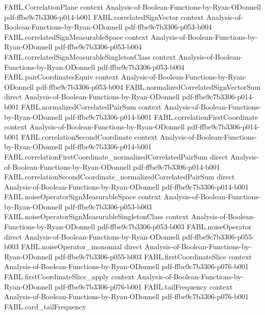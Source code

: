 \begin{theorem}
\proofstep
  {FABL.CorrelationPlane}
  {context}
  {Analysis-of-Boolean-Functions-by-Ryan-ODonnell}
  {pdf-ffbe9c7b3306-p014-b001}
\proofstep
  {FABL.correlatedSignVector}
  {context}
  {Analysis-of-Boolean-Functions-by-Ryan-ODonnell}
  {pdf-ffbe9c7b3306-p053-b004}
\proofstep
  {FABL.correlatedSignMeasurableSpace}
  {context}
  {Analysis-of-Boolean-Functions-by-Ryan-ODonnell}
  {pdf-ffbe9c7b3306-p053-b004}
\proofstep
  {FABL.correlatedSignMeasurableSingletonClass}
  {context}
  {Analysis-of-Boolean-Functions-by-Ryan-ODonnell}
  {pdf-ffbe9c7b3306-p053-b004}
\proofstep
  {FABL.pairCoordinatesEquiv}
  {context}
  {Analysis-of-Boolean-Functions-by-Ryan-ODonnell}
  {pdf-ffbe9c7b3306-p053-b004}
\proofstep
  {FABL.normalizedCorrelatedSignVectorSum}
  {direct}
  {Analysis-of-Boolean-Functions-by-Ryan-ODonnell}
  {pdf-ffbe9c7b3306-p014-b001}
\proofstep
  {FABL.normalizedCorrelatedPairSum}
  {context}
  {Analysis-of-Boolean-Functions-by-Ryan-ODonnell}
  {pdf-ffbe9c7b3306-p014-b001}
\proofstep
  {FABL.correlationFirstCoordinate}
  {context}
  {Analysis-of-Boolean-Functions-by-Ryan-ODonnell}
  {pdf-ffbe9c7b3306-p014-b001}
\proofstep
  {FABL.correlationSecondCoordinate}
  {context}
  {Analysis-of-Boolean-Functions-by-Ryan-ODonnell}
  {pdf-ffbe9c7b3306-p014-b001}
\proofstep
  {FABL.correlationFirstCoordinate_normalizedCorrelatedPairSum}
  {direct}
  {Analysis-of-Boolean-Functions-by-Ryan-ODonnell}
  {pdf-ffbe9c7b3306-p014-b001}
\proofstep
  {FABL.correlationSecondCoordinate_normalizedCorrelatedPairSum}
  {direct}
  {Analysis-of-Boolean-Functions-by-Ryan-ODonnell}
  {pdf-ffbe9c7b3306-p014-b001}
\proofstep
  {FABL.noiseOperatorSignMeasurableSpace}
  {context}
  {Analysis-of-Boolean-Functions-by-Ryan-ODonnell}
  {pdf-ffbe9c7b3306-p053-b003}
\proofstep
  {FABL.noiseOperatorSignMeasurableSingletonClass}
  {context}
  {Analysis-of-Boolean-Functions-by-Ryan-ODonnell}
  {pdf-ffbe9c7b3306-p053-b003}
\proofstep
  {FABL.noiseOperator}
  {direct}
  {Analysis-of-Boolean-Functions-by-Ryan-ODonnell}
  {pdf-ffbe9c7b3306-p055-b003}
\proofstep
  {FABL.noiseOperator_monomial}
  {direct}
  {Analysis-of-Boolean-Functions-by-Ryan-ODonnell}
  {pdf-ffbe9c7b3306-p055-b003}
\proofstep
  {FABL.firstCoordinateSlice}
  {context}
  {Analysis-of-Boolean-Functions-by-Ryan-ODonnell}
  {pdf-ffbe9c7b3306-p076-b001}
\proofstep
  {FABL.firstCoordinateSlice_apply}
  {context}
  {Analysis-of-Boolean-Functions-by-Ryan-ODonnell}
  {pdf-ffbe9c7b3306-p076-b001}
\proofstep
  {FABL.tailFrequency}
  {context}
  {Analysis-of-Boolean-Functions-by-Ryan-ODonnell}
  {pdf-ffbe9c7b3306-p076-b001}
\proofstep
  {FABL.card_tailFrequency}

\end{theorem}
